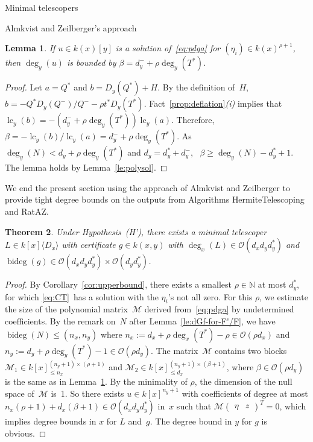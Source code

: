 \documentclass{sig-alt-full}
\newcommand{\bigO}{{\mathcal{O}}}
\newcommand{\lc}{\operatorname{lc}}
\newcommand{\bideg}{\operatorname{bideg}}
\newcommand{\bN}{\mathbb{N}}
\newcommand{\cM}{\mathcal M}
\newtheorem{lemma}{Lemma}
\newtheorem{theorem}[lemma]{Theorem}
\begin{document}
\begin{section}{Minimal telescopers}
\begin{subsection}{Almkvist and Zeilberger's approach}
\begin{lemma}\label{le:degb}
If $u\in k(x)[y]$ is a solution of~\eqref{eq:pdga} for $(\eta_i)\in
k(x)^{\rho+1}$, then\/ $\deg_y(u)$ is bounded by $\beta = d_y^- + \rho
\deg_y(T^*)$.
\end{lemma}
\begin{proof}
Let $a=Q^*$ and $b=D_y(Q^*)+ H$.
By the definition of~$H$,
$b =-Q^*D_y(Q^-)/Q^- - \rho t^*D_y(T^*)$.
Fact~\ref{prop:deflation}\emph{(i)\/} implies that
$\lc_y(b)=-(d_y^- + \rho \deg_y(T^*))\lc_y(a)$.
Therefore, $\beta =
-\lc_y(b)/\lc_y(a)= d_y^- + \rho \deg_y(T^*)$.
As $\deg_y(N)< d_y
+ \rho\deg_y(T^*)$ and $d_y = d_y^* + d_y^-$, \ $\beta\ge
\deg_y(N)-d_y^*+1$.
The lemma holds by Lemma~\ref{le:polysol}.
\end{proof}

We end the present section using the approach of Almkvist and Zeilberger
to provide tight degree bounds on the outputs from Algorithms
\textsf{HermiteTelescoping} and \textsf{RatAZ}.

\begin{theorem}\label{th:AZtelesize}
Under Hypothesis~(H'), there exists a minimal telescoper $L \in
k[x]\langle D_x \rangle$ with certificate $g \in k(x, y)$ with
$\deg_x(L)\in \bigO(d_xd_yd_y^*) $ and $\bideg(g) \in \bigO(d_xd_yd_y^*)
\times \bigO(d_yd_y^*)$.
\end{theorem}

\begin{proof}
By Corollary~\ref{cor:upperbound}, there exists a
smallest $\rho\in \bN$ at most $d_y^*$, for which \eqref{eq:CT}~has a
solution with the $\eta_i$'s not all zero.
For this $\rho$, we estimate the size of the polynomial
matrix~$\cM$ derived from~\eqref{eq:pdga} by undetermined
coefficients.
By the remark on~$N$ after
Lemma~\ref{le:dGf-for-F'/F}, we have $\bideg(N) \le (n_x,n_y)$ where
$n_x := d_x + \rho \deg_x(T^*)-\rho\in \bigO(\rho d_x)$ and
$n_y := d_y + \rho \deg_y(T^*)-1\in \bigO(\rho d_y)$.
The matrix~$\cM$ contains two blocks
$\cM_1\in k[x]_{\leq n_x}^{(n_y+1)\times(\rho+1)}$ and $\cM_2\in k[x]_{\leq
d_x}^{(n_y+1)\times(\beta+1)}$, where $\beta\in \bigO(\rho d_y)$ is the
same as in Lemma~\ref{le:degb}.
By the minimality of $\rho$, the dimension of the null space of~$\cM$
is~1. So there exists $u\in k[x]^{n_y+1}$ with coefficients of
degree at most $n_x(\rho+1)+d_x(\beta+1)\in \bigO(d_x d_yd_y^*)$ in~$x$
such that $\cM\begin{pmatrix}\eta&z\end{pmatrix}^T=0$, which implies degree bounds in $x$ for $L$ and~$g$.
The degree bound in $y$ for $g$ is
obvious.
\end{proof}


\end{subsection}
\end{section}
\end{document}
